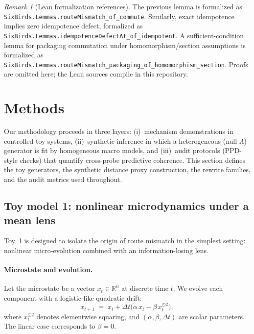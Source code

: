 \documentclass[11pt]{article}
\theoremstyle{definition}
\theoremstyle{plain}
\theoremstyle{remark}
\newtheorem{remark}[definition]{Remark}
\begin{document}
\begin{remark}[Lean formalization references]
The previous lemma is formalized as
\texttt{SixBirds.\allowbreak Lemmas.\allowbreak routeMismatch\_\allowbreak of\_commute}.
Similarly, exact idempotence implies zero idempotence defect, formalized as
\texttt{SixBirds.\allowbreak Lemmas.\allowbreak idempotenceDefectAt\_\allowbreak of\_idempotent}.
A sufficient-condition lemma for packaging commutation under homomorphism/section assumptions is formalized as
\texttt{SixBirds.\allowbreak Lemmas.\allowbreak routeMismatch\_\allowbreak packaging\_\allowbreak of\_homomorphism\_\allowbreak section}.
Proofs are omitted here; the Lean sources compile in this repository.
\end{remark}

\section{Methods}\label{sec:methods}
Our methodology proceeds in three layers: (i)~mechanism demonstrations in controlled toy systems, (ii)~synthetic inference in which a heterogeneous (null-$\Lambda$) generator is fit by homogeneous macro models, and (iii)~audit protocols (PPD-style checks) that quantify cross-probe predictive coherence. This section defines the toy generators, the synthetic distance proxy construction, the rewrite families, and the audit metrics used throughout.

\subsection{Toy model 1: nonlinear microdynamics under a mean lens}\label{sec:methods:toy1}
Toy~1 is designed to isolate the origin of route mismatch in the simplest setting: nonlinear micro-evolution combined with an information-losing lens.

\paragraph{Microstate and evolution.}
Let the microstate be a vector $x_t\in\mathbb{R}^n$ at discrete time $t$.
We evolve each component with a logistic-like quadratic drift:
\begin{equation}
x_{t+1} \;=\; x_t + \Delta t\big(\alpha\,x_t - \beta\,x_t^{\odot 2}\big),
\label{eq:toy1_dynamics}
\end{equation}
where $x_t^{\odot 2}$ denotes elementwise squaring, and $(\alpha,\beta,\Delta t)$ are scalar parameters.
The linear case corresponds to $\beta=0$.
\end{document}
